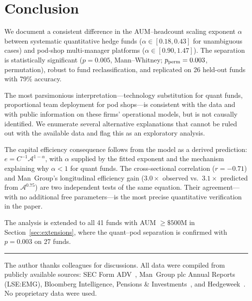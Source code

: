 \documentclass[10pt,onecolumn]{article}
\newcommand{\Ac}{\mathcal{A}}
\begin{document}
\section{\label{sec:conclusion}Conclusion}

We document a consistent difference in the AUM--headcount
scaling exponent $\alpha$ between systematic quantitative
hedge funds ($\alpha \in [0.18, 0.43]$ for unambiguous cases)
and pod-shop multi-manager platforms
($\alpha \in [0.90, 1.47]$).
The separation is statistically significant ($p = 0.005$,
Mann--Whitney; $p_{\rm perm} = 0.003$, permutation),
robust to fund reclassification, and replicated on 26 held-out
funds with 79\% accuracy.

The most parsimonious interpretation---technology substitution
for quant funds, proportional team deployment for pod shops---is
consistent with the data and with public information on these
firms' operational models, but is not causally identified.
We enumerate several alternative explanations that cannot be
ruled out with the available data and flag this as an
exploratory analysis.

The capital efficiency consequence follows from the model
as a derived prediction: $e = C^{-1}\Ac^{1-\alpha}$, with $\alpha$
supplied by the fitted exponent and the mechanism explaining why
$\alpha < 1$ for quant funds.
The cross-sectional correlation ($r=-0.71$) and Man~Group's
longitudinal efficiency gain ($3.0\times$ observed vs.\ $3.1\times$
predicted from $\Ac^{0.75}$) are two independent tests of the
same equation.
Their agreement---with no additional free parameters---is the
most precise quantitative verification in the paper.

The analysis is extended to all 41 funds with AUM $\geq \$500$M
in Section~\ref{sec:extensions}, where the quant--pod separation
is confirmed with $p = 0.003$ on 27 funds.


\bigskip
\noindent\rule{0.4\textwidth}{0.3pt}

\noindent The author thanks colleagues for discussions.
All data were compiled from publicly available sources:
SEC Form ADV~\cite{sec_adv},
Man~Group plc Annual Reports (LSE:EMG),
Bloomberg Intelligence,
Pensions \& Investments~\cite{pandi2024},
and Hedgeweek~\cite{hedgeweek2024}.
No proprietary data were used.
\end{document}
